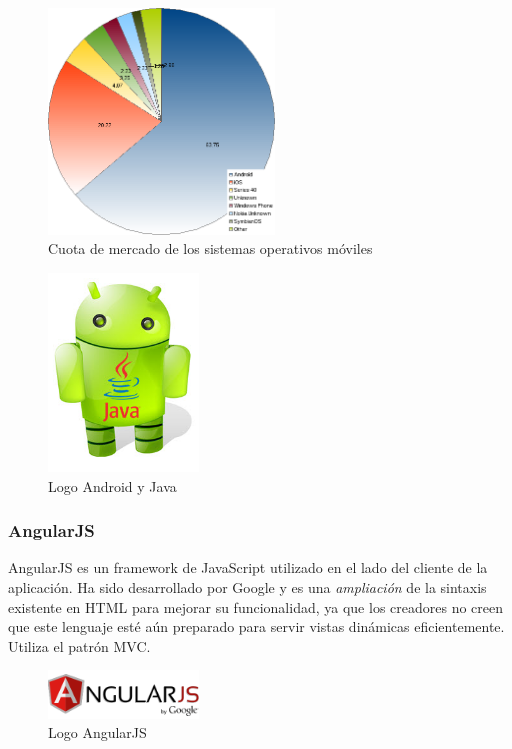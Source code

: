 		\begin{figure}[h!btp]
		\centering
		\includegraphics[width=60mm, fbox={\fboxrule} 4mm]{images/04-metodo/09-os_mobile.png}
		\caption{Cuota de mercado de los sistemas operativos móviles}
		\label{fig:os-mobile}
		\end{figure}
		
		\begin{figure}[H]
		\centering
		\includegraphics[width=40mm, fbox={\fboxrule} 4mm]{images/04-metodo/10-android_java.jpg}
		\caption{Logo Android y Java}
		\label{fig:android-java-logo}
		\end{figure}
		
		\subsubsection{AngularJS}
		AngularJS es un framework de JavaScript utilizado en el lado del cliente de la aplicación. Ha sido desarrollado por Google y es una \textit{ampliación} de la sintaxis existente en \ac{HTML} para mejorar su funcionalidad, ya que los creadores no creen que este lenguaje esté aún preparado para servir vistas dinámicas eficientemente. Utiliza el patrón \ac{MVC}.
		
		\begin{figure}[H]
		\centering
		\includegraphics[width=40mm, fbox={\fboxrule} 4mm]{images/04-metodo/22-angularjs_logo.png}
		\caption{Logo AngularJS}
		\label{fig:angularjs-logo}
		\end{figure}


